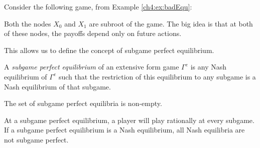 \begin{example}
Consider the following game, from Example \ref{ch4:ex:badEqu}:
\begin{figure}[!ht]
\begin{center}
\end{center}
\end{figure}

Both the nodes $X_0$ and $X_1$ are subroot of the game. 
The big idea is that at both of these nodes, the payoffs depend only on future actions.
\label{ch5:ex:subgame1}
\end{example}
This allows us to define the concept of subgame perfect equilibrium.
\begin{definition}
A \emph{subgame perfect equilibrium} of an extensive form game $\Gamma^e$ is any Nash equilibrium of $\Gamma^e$ such that the restriction of this equilibrium to any subgame is a Nash equilibrium of that subgame.
\end{definition}
\begin{theorem}
The set of subgame perfect equilibria is non-empty.
\end{theorem}
At a subgame perfect equilibrium, a player will play rationally at every subgame. 
If a subgame perfect equilibrium is a Nash equilibrium, all Nash equilibria are not subgame perfect.
